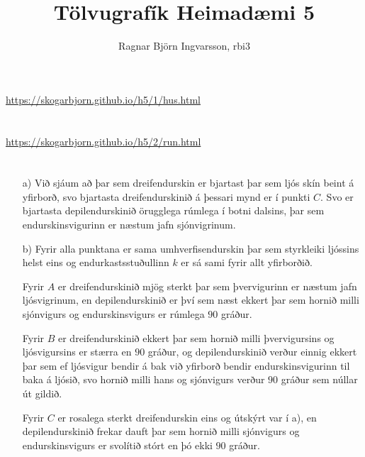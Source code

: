 \documentclass{article}
\title{Tölvugrafík Heimadæmi 5}
\author{Ragnar Björn Ingvarsson, rbi3}
\begin{document}
\renewcommand\thepage{}

	\maketitle

	\newpage
	\setcounter{page}{1}
	\renewcommand\thepage{\arabic{page}}

	\section{}
	\url{https://skogarbjorn.github.io/h5/1/hus.html}
	\section{}
	\url{https://skogarbjorn.github.io/h5/2/run.html}

	\section{}
    \begin{itemize}
    	\item[a)] Við sjáum að þar sem dreifendurskin er bjartast þar sem 
			ljós skín beint á yfirborð, svo bjartasta dreifendurskinið á 
			þessari mynd er í punkti $C$. Svo er bjartasta depilendurskinið 
			örugglega rúmlega í botni dalsins, þar sem endurskinsvigurinn 
			er næstum jafn sjónvigrinum.
    	\item[b)] Fyrir alla punktana er sama umhverfisendurskin þar sem 
			styrkleiki ljóssins helst eins og endurkastsstuðullinn $k$ er 
			sá sami fyrir allt yfirborðið.

			Fyrir $A$ er dreifendurskinið mjög sterkt þar sem þvervigurinn 
			er næstum jafn ljósvigrinum, en depilendurskinið er því sem næst 
			ekkert þar sem hornið milli sjónvigurs og endurskinsvigurs er 
			rúmlega $90$ gráður.

			Fyrir $B$ er dreifendurskinið ekkert 
			þar sem hornið milli þvervigursins og ljósvigursins er stærra en 
			$90$ gráður, og depilendurskinið verður einnig ekkert þar sem 
			ef ljósvigur bendir á bak við yfirborð bendir endurskinsvigurinn 
			til baka á ljósið, svo hornið milli hans og sjónvigurs verður 
			$90$ gráður sem núllar út gildið. 

			Fyrir $C$ er rosalega sterkt 
			dreifendurskin eins og útskýrt var í a), en depilendurskinið 
			frekar dauft þar sem hornið milli sjónvigurs og endurskinsvigurs 
			er svolítið stórt en þó ekki $90$ gráður.
    \end{itemize}
\end{document}
